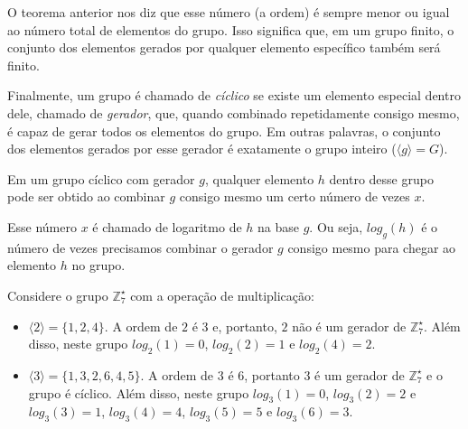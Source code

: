 O teorema anterior nos diz que esse número (a ordem) é sempre menor ou igual ao número total de elementos do grupo.
Isso significa que, em um grupo finito, o conjunto dos elementos gerados por qualquer elemento específico também será finito.

Finalmente, um grupo é chamado de {\em cíclico} se existe um elemento especial dentro dele, chamado de {\em gerador}, que, quando combinado repetidamente consigo mesmo, é capaz de gerar todos os elementos do grupo.
Em outras palavras, o conjunto dos elementos gerados por esse gerador é exatamente o grupo inteiro ($\langle g \rangle = G$).

Em um grupo cíclico com gerador $g$, qualquer elemento $h$ dentro desse grupo pode ser obtido ao combinar $g$ consigo mesmo um certo número de vezes $x$.

Esse número $x$ é chamado de logaritmo de $h$ na base $g$.
Ou seja, $log_g(h)$ é o número de vezes precisamos combinar o gerador $g$ consigo mesmo para chegar ao elemento $h$ no grupo.

\begin{example}
Considere o grupo $\mathbb{Z}_7^\star$ com a operação de multiplicação:
\begin{itemize}
\item[] $\langle 2 \rangle = \{1, 2, 4\}$.
  A ordem de $2$ é $3$ e, portanto, $2$ não é um gerador de $\mathbb{Z}_7^\star$.
  Além disso, neste grupo $log_2(1) = 0$, $log_2(2) = 1$ e $log_2(4) = 2$.
\item[] $\langle 3 \rangle = \{1, 3, 2, 6, 4, 5\}$.
  A ordem de $3$ é $6$, portanto $3$ é um gerador de $\mathbb{Z}_7^\star$ e o grupo é cíclico.
Além disso, neste grupo $log_3(1) = 0$, $log_3(2) = 2$ e $log_3(3) = 1$, $log_3(4)= 4$, $log_3(5) = 5$ e $log_3(6) = 3$.
\end{itemize}
\end{example}

